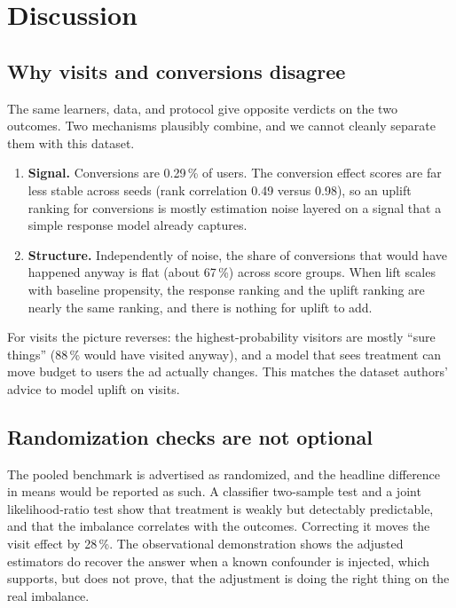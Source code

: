 \section{Discussion}
\label{sec:discussion}

\subsection{Why visits and conversions disagree}
\label{sec:why-disagree}

The same learners, data, and protocol give opposite verdicts on the two
outcomes. Two mechanisms plausibly combine, and we cannot cleanly separate
them with this dataset.

\begin{enumerate}
  \item \textbf{Signal.} Conversions are 0.29\,\% of users. The conversion
        effect scores are far less stable across seeds (rank correlation
        0.49 versus 0.98), so an uplift ranking for conversions is mostly
        estimation noise layered on a signal that a simple response model
        already captures.
  \item \textbf{Structure.} Independently of noise, the share of conversions
        that would have happened anyway is flat (about 67\,\%) across score
        groups. When lift scales with baseline propensity, the response
        ranking and the uplift ranking are nearly the same ranking, and
        there is nothing for uplift to add.
\end{enumerate}

For visits the picture reverses: the highest-probability visitors are mostly
``sure things'' (88\,\% would have visited anyway), and a model that sees
treatment can move budget to users the ad actually changes. This matches the
dataset authors' advice to model uplift on visits.

\subsection{Randomization checks are not optional}
\label{sec:imbalance}

The pooled benchmark is advertised as randomized, and the headline
difference in means would be reported as such. A classifier two-sample test
and a joint likelihood-ratio test show that treatment is weakly but
detectably predictable, and that the imbalance correlates with the outcomes.
Correcting it moves the visit effect by 28\,\%. The observational
demonstration shows the adjusted estimators do recover the answer when a
known confounder is injected, which supports, but does not prove, that the
adjustment is doing the right thing on the real imbalance.

